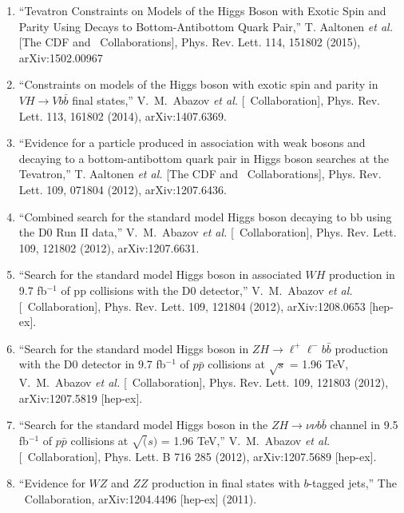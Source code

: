 \begin{enumerate}
\item ``Tevatron Constraints 
on Models of the Higgs Boson with Exotic Spin and Parity Using Decays 
to Bottom-Antibottom Quark Pair,'' T. Aaltonen {\it et al.} 
[The CDF and \dzero\ Collaborations], 
Phys. Rev. Lett. 114, 151802 (2015),
arXiv:1502.00967


\item ``Constraints on models of the Higgs boson with exotic spin and parity in $VH\to Vb\bar{b}$ final states,''
V.~M.~Abazov {\it et al.}  [\dzero\ Collaboration],
Phys. Rev. Lett. 113, 161802 (2014),
arXiv:1407.6369.

\item ``Evidence for a particle produced in association with weak bosons and decaying to a 
        bottom-antibottom quark pair in Higgs boson searches at the Tevatron,''
T. Aaltonen {\it et al.} [The CDF and \dzero\ Collaborations],
Phys. Rev. Lett. 109, 071804 (2012),
arXiv:1207.6436.

\item ``Combined search for the standard model Higgs boson decaying to bb using the D0 Run II data,''
V.~M.~Abazov {\it et al.}  [\dzero\ Collaboration],
Phys. Rev. Lett. 109, 121802 (2012),
arXiv:1207.6631.

\item ``Search for the standard model Higgs boson in associated $WH$ production in 9.7 fb$^{-1}$
          of pp collisions with the D0 detector,''
V.~M.~Abazov {\it et al.}  [\dzero\ Collaboration],
Phys. Rev. Lett. 109, 121804 (2012),
arXiv:1208.0653 [hep-ex].

\item ``Search for the standard model Higgs boson in $ZH\to\ell^+\ell^- b{\bar b}$ production with the D0
          detector in 9.7 fb$^{-1}$ of $p{\bar p}$ collisions at $\sqrt{s}$ = 1.96 TeV,
V.~M.~Abazov {\it et al.}  [\dzero\ Collaboration],
Phys. Rev. Lett. 109, 121803 (2012),
arXiv:1207.5819 [hep-ex].

\item ``Search for the standard model Higgs boson in the $ZH\to\nu\nu b{\bar b}$ channel in 9.5 fb$^{-1}$ of $p{\bar p}$ collisions at $\sqrt(s)$ = 1.96 TeV,'' 
V.~M.~Abazov {\it et al.}  [\dzero\ Collaboration],
Phys. Lett. B 716 285 (2012),
 arXiv:1207.5689 [hep-ex].

\item ``Evidence for $WZ$ and $ZZ$ production in final states with $b$-tagged jets,''
The \dzero\ Collaboration,
arXiv:1204.4496 [hep-ex] (2011).


\end{enumerate}
